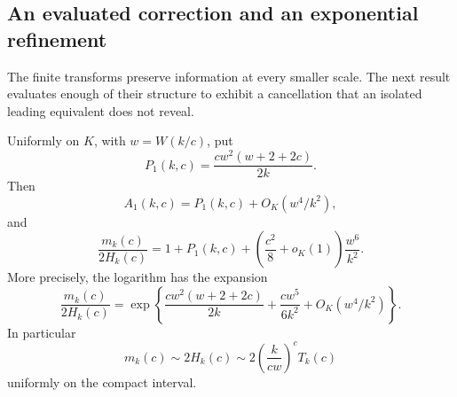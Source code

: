 \documentclass[11pt,letterpaper]{article}
\theoremstyle{remark}\newtheorem{remark}[theorem]{Remark}
\theoremstyle{definition}\newtheorem{definition}[theorem]{Definition}
\begin{document}
\subsection{An evaluated correction and an exponential refinement}

The finite transforms preserve information at every smaller scale.
The next result evaluates enough of their structure to exhibit a
cancellation that an isolated leading equivalent does not reveal.

\begin{corollary}\label{sgm:md:cm:explicit}
Uniformly on \(K\), with \(w=W(k/c)\), put
\[
 P_1(k,c)=\frac{cw^2(w+2+2c)}{2k}.
\]
Then
\begin{equation}\label{sgm:md:cm:A1-explicit}
 A_1(k,c)=P_1(k,c)+O_K(w^4/k^2),
\end{equation}
and
\begin{equation}\label{sgm:md:cm:explicit-remainder}
 \frac{m_k(c)}{2H_k(c)}
 =1+P_1(k,c)
       +\left(\frac{c^2}{8}+o_K(1)\right)\frac{w^6}{k^2}.
\end{equation}
More precisely, the logarithm has the expansion
\begin{equation}\label{sgm:md:cm:exponential}
 \frac{m_k(c)}{2H_k(c)}
 =\exp\left\{
       \frac{cw^2(w+2+2c)}{2k}
       +\frac{cw^5}{6k^2}
       +O_K(w^4/k^2)\right\}.
\end{equation}
In particular
\[
 m_k(c)\sim 2H_k(c)
       \sim 2\left(\frac{k}{cw}\right)^cT_k(c)
\]
uniformly on the compact interval.
\end{corollary}
\end{document}
